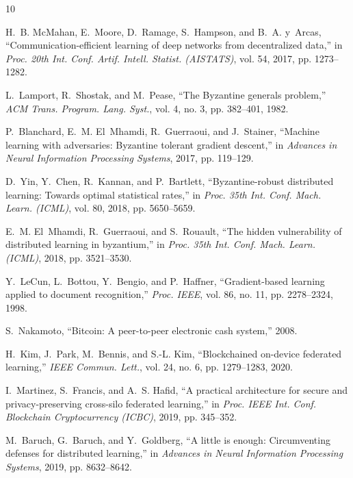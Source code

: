 \documentclass[12pt,a4paper,onecolumn]{article}
\begin{document}

\begin{thebibliography}{10}

H.~B. McMahan, E.~Moore, D.~Ramage, S.~Hampson, and B.~A. y~Arcas,
``Communication-efficient learning of deep networks from decentralized data,''
in \emph{Proc. 20th Int. Conf. Artif. Intell. Statist. (AISTATS)}, vol. 54, 2017, pp. 1273--1282.

L.~Lamport, R.~Shostak, and M.~Pease,
``The Byzantine generals problem,''
\emph{ACM Trans. Program. Lang. Syst.}, vol. 4, no. 3, pp. 382--401, 1982.

P.~Blanchard, E.~M. El~Mhamdi, R.~Guerraoui, and J.~Stainer,
``Machine learning with adversaries: Byzantine tolerant gradient descent,''
in \emph{Advances in Neural Information Processing Systems}, 2017, pp. 119--129.

D.~Yin, Y.~Chen, R.~Kannan, and P.~Bartlett,
``Byzantine-robust distributed learning: Towards optimal statistical rates,''
in \emph{Proc. 35th Int. Conf. Mach. Learn. (ICML)}, vol. 80, 2018, pp. 5650--5659.

E.~M. El~Mhamdi, R.~Guerraoui, and S.~Rouault,
``The hidden vulnerability of distributed learning in byzantium,''
in \emph{Proc. 35th Int. Conf. Mach. Learn. (ICML)}, 2018, pp. 3521--3530.

Y.~LeCun, L.~Bottou, Y.~Bengio, and P.~Haffner,
``Gradient-based learning applied to document recognition,''
\emph{Proc. IEEE}, vol. 86, no. 11, pp. 2278--2324, 1998.

S.~Nakamoto,
``Bitcoin: A peer-to-peer electronic cash system,'' 2008.

H.~Kim, J.~Park, M.~Bennis, and S.-L. Kim,
``Blockchained on-device federated learning,''
\emph{IEEE Commun. Lett.}, vol. 24, no. 6, pp. 1279--1283, 2020.

I.~Martinez, S.~Francis, and A.~S. Hafid,
``A practical architecture for secure and privacy-preserving cross-silo federated learning,''
in \emph{Proc. IEEE Int. Conf. Blockchain Cryptocurrency (ICBC)}, 2019, pp. 345--352.

M.~Baruch, G.~Baruch, and Y.~Goldberg,
``A little is enough: Circumventing defenses for distributed learning,''
in \emph{Advances in Neural Information Processing Systems}, 2019, pp. 8632--8642.


\end{thebibliography}
\end{document}
